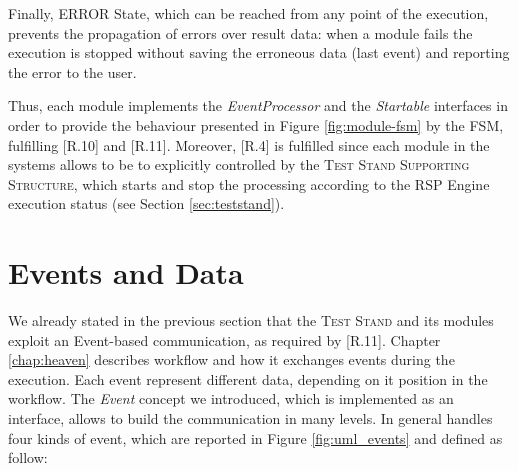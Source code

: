 Finally, ERROR State, which can be reached from any point of the execution, prevents the propagation of errors over result data: when a module fails the execution is stopped without saving the erroneous data (last event) and reporting the error to the user.

Thus, each \name module implements the \textit{EventProcessor} and the \textit{Startable} interfaces in order to provide the behaviour presented in Figure \ref{fig:module-fsm} by the FSM, fulfilling [R.10] and [R.11]. Moreover,  [R.4] is fulfilled since each module in the systems allows to be to explicitly controlled by the \textsc{Test Stand Supporting Structure}, which starts and stop the processing according to the RSP Engine execution status (see Section \ref{sec:teststand}). 

\pagebreak

\section{Events and Data}\label{sec:data-impl}

We already stated in the previous section that the \textsc{Test Stand} and its modules exploit an Event-based communication, as required by [R.11]. Chapter \ref{chap:heaven} describes \name workflow and how it exchanges events during the execution. Each event represent different data, depending on it position in the workflow. The \textit{Event} concept we introduced, which is implemented as an interface, allows to build the communication in many levels. In general \name handles four kinds of event, which are reported in Figure \ref{fig:uml_events} and defined as follow:

